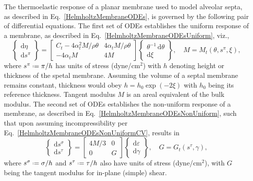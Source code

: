 The thermo\-elastic response of a planar membrane used to model alveolar septa, as described in Eq.~\ref{HelmholtzMembraneODEs}, is governed by the following pair of differential equations.  The first set of ODEs establishes the uniform response of a membrane, as described in Eq.~\ref{HelmholtzMembraneODEsUniform}, viz.,
\begin{displaymath}
    \left\{ \begin{matrix}
    \mathrm{d} \eta \\ \mathrm{d} s^{\pi}
    \end{matrix} \right\} = \begin{bmatrix}
    C_t - 4 \alpha^2_t M / \rho \theta & 
    4 \alpha_t M / \rho \theta \\
    -4 \alpha_t M & 4 M
    \end{bmatrix} \left\{ \begin{matrix}
    \theta^{-1} \, \mathrm{d} \theta \\ \mathrm{d} \xi
    \end{matrix} \right\} , \quad
    M = M_t ( \theta , s^{\pi} , \xi ),
\end{displaymath}
where $s^{\pi} \defeq \pi / h$ has units of stress (dyne/$\text{cm}^2$) with $h$ denoting height or thickness of the spetal membrane.  Assuming the volume of a septal membrane remains constant, thickness would obey $h = h_0 \exp ( -2 \xi )$ with $h_0$ being its reference thickness.  Tangent modulus $M$ is an areal equivalent of the bulk modulus.  The second set of ODEs establishes the non-uniform response of a membrane, as described in Eq.~\ref{HelmholtzMembraneODEsNonUniform}, such that upon assuming incompressibility per Eq.~\ref{HelmholtzMembraneODEsNonUniformCV}, results in
\begin{displaymath}
    \left\{ \begin{matrix}
    \mathrm{d} s^{\sigma} \\ \mathrm{d} s^{\tau}
    \end{matrix} \right\} = \begin{bmatrix}
    4M/3 & 0 \\
    0 & G
    \end{bmatrix} \left\{ \begin{matrix}
    \mathrm{d} \varepsilon \\ \mathrm{d} \gamma
    \end{matrix} \right\} , \quad
        G = G_t ( s^{\tau} , \gamma ),
\end{displaymath}
where $s^{\sigma} \defeq \sigma / h$ and $s^{\tau} \defeq \tau / h$ also have units of stress (dyne/$\text{cm}^2$), with $G$ being the tangent modulus for in-plane (simple) shear. 

